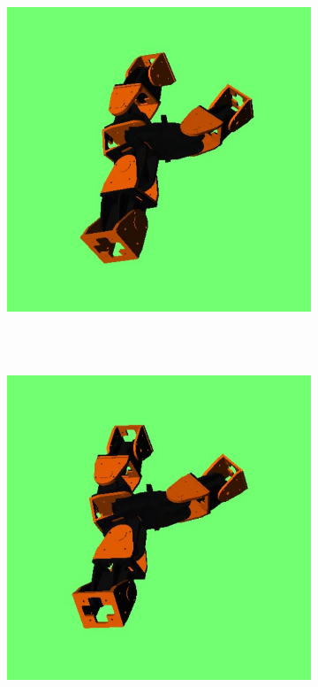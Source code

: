 \begin{figure}[h]
\begin{subfigure}[b]{0.18\textwidth}
                 \\~
        \end{subfigure}
        ~
        \begin{subfigure}[b]{0.18\textwidth}
         	   \centering
                \includegraphics[width=\textwidth]{images/results_7_gait_05.png}
                 \\~
        \end{subfigure}
        ~
                \begin{subfigure}[b]{0.18\textwidth}
                \centering
                \includegraphics[width=\textwidth]{images/results_7_gait_06.png}

\end{subfigure}
\end{figure}
